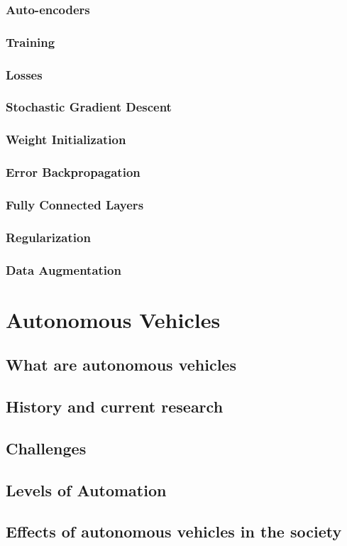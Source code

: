 \subsubsection{Auto-encoders}
\subsubsection{Training}
\subsubsection{Losses}
\subsubsection{Stochastic Gradient Descent}
\subsubsection{Weight Initialization}
\subsubsection{Error Backpropagation}

\subsubsection{Fully Connected Layers}\label{sub:fully}
\subsubsection{Regularization}
\subsubsection{Data Augmentation}



\section{Autonomous Vehicles} \label{autonomous-vehicles}
\subsection{What are autonomous vehicles}
\subsection{History and current research}
\subsection{Challenges}
\subsection{Levels	of	Automation}
\subsection{Effects of autonomous vehicles in the society}